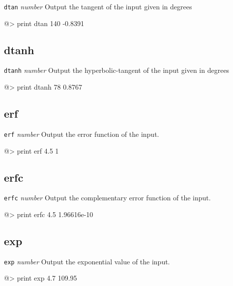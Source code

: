 {\tt dtan} {\it number} 
\newline\newline 
Output the tangent of the input given in degrees 
\begin{verbatimtab} 
@> print dtan 140 
-0.8391
\end{verbatimtab}

\subsection*{dtanh}  
 
{\tt dtanh} {\it number} 
\newline\newline 
Output the hyperbolic-tangent of the input given in degrees 
\begin{verbatimtab} 
@> print dtanh 78 
0.8767
\end{verbatimtab}

\subsection*{erf}  
 
{\tt erf} {\it number} 
\newline\newline 
Output the error function of the input. 
\begin{verbatimtab} 
@> print erf 4.5 
1 
\end{verbatimtab}
 
\subsection*{erfc}  
 
{\tt erfc} {\it number} 
\newline\newline 
Output the complementary error function of the input. 
\begin{verbatimtab} 
@> print erfc 4.5 
1.96616e-10 
\end{verbatimtab}
 
\subsection*{exp}  
 
{\tt exp} {\it number} 
\newline\newline 
Output the exponential value of the input. 
\begin{verbatimtab} 
@> print exp 4.7 
109.95 
\end{verbatimtab} 
 
